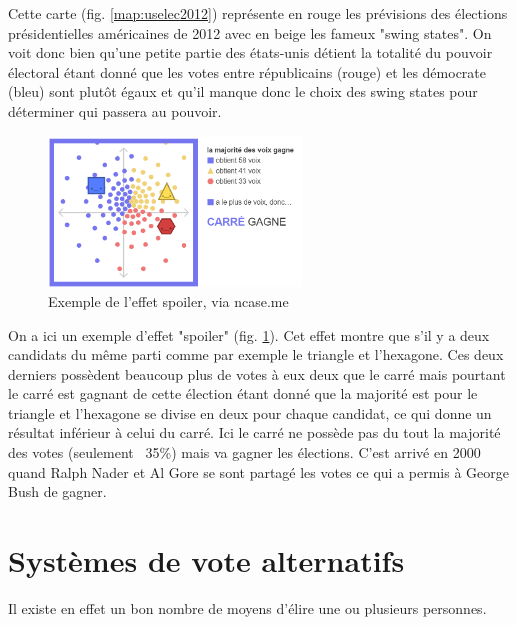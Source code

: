 \documentclass[11pt,a4paper]{report}
\begin{document}
Cette carte (fig. \ref{map:uselec2012}) représente en rouge les prévisions des élections présidentielles américaines de 2012 avec en beige les fameux "swing states".
On voit donc bien qu'une petite partie des états-unis détient la totalité du pouvoir électoral étant donné que les votes entre républicains (rouge) et les démocrate (bleu) sont plutôt égaux et qu'il manque donc le choix des swing states pour déterminer qui passera au pouvoir.

\begin{figure}[h]
	\centering
	\includegraphics[width=0.6\textwidth]{./images/spoiler-effect.png}
	\caption{Exemple de l'effet spoiler, via ncase.me \cite{ncase:ballot}}
	\label{sim:spoilereffect}
\end{figure}


On a ici un exemple d'effet "spoiler" (fig. \ref{sim:spoilereffect}).
Cet effet montre que s'il y a deux candidats du même parti comme par exemple le triangle et l'hexagone.
Ces deux derniers possèdent beaucoup plus de votes à eux deux que le carré mais pourtant le carré est gagnant de cette élection étant donné que la majorité est pour le triangle et l'hexagone se divise en deux pour chaque candidat, ce qui donne un résultat inférieur à celui du carré.
Ici le carré ne possède pas du tout la majorité des votes (seulement ~35\%) mais va gagner les élections.
C'est arrivé en 2000 quand Ralph Nader et Al Gore se sont partagé les votes ce qui a permis à George Bush de gagner.
\nocite{ncase:ballot}

\section{Systèmes de vote alternatifs}
Il existe en effet un bon nombre de moyens d’élire une ou plusieurs personnes.
\end{document}
